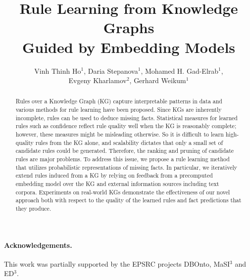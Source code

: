 \documentclass[a4paper]{llncs}
\begin{document}
%
\frontmatter          
%
\pagestyle{headings}  

\mainmatter              
%
\title{
Rule Learning from Knowledge Graphs\\ Guided by Embedding Models}
\titlerunning{}  

\newcommand{\authspace}{\hspace{1.5ex}}
\author{%
Vinh Thinh Ho$^{1}$,
Daria Stepanova$^{1}$,
Mohamed H. Gad-Elrab$^{1}$,\\
Evgeny Kharlamov$^{2}$,
Gerhard Weikum$^{1}$
}		


\maketitle        


\begin{abstract}

Rules over a Knowledge Graph (KG) capture 
interpretable 
patterns in data
and various methods for rule learning have been proposed. 
Since KGs are inherently incomplete,
rules can be used to deduce missing facts. 
Statistical measures for learned rules such as confidence reflect rule quality well when the KG
is reasonably complete; however, these measures might be misleading otherwise. 
So it is difficult to learn high-quality
rules from the KG alone, 
and scalability dictates that only a small set
of candidate rules could be generated.
Therefore, the ranking and pruning 
of candidate rules are major problems.
To address this issue, we propose a rule learning method that utilizes probabilistic representations of missing facts. In particular, we iteratively extend rules induced from a KG by relying on feedback from a precomputed embedding model over the KG and
external information sources including text corpora. Experiments on real-world KGs demonstrate the effectiveness of our novel approach both with respect to the quality of the learned rules and fact predictions that they produce.
\end{abstract}









\paragraph*{Acknowledgements.}
This work was partially supported by the EPSRC projects DBOnto,
MaSI$^3$ and ED$^3$.




\end{document}
